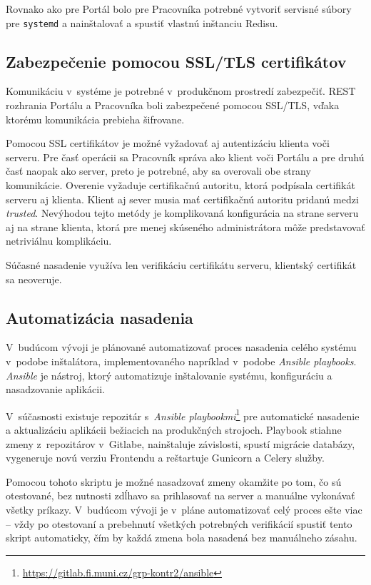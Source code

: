 \documentclass[
  digital, %
  oneside, %
  table,   %
  lof,     %
  lot,   %
]{fithesis3}
\begin{document}
Rovnako ako pre Portál bolo pre Pracovníka potrebné vytvoriť servisné súbory pre \texttt{systemd} a nainštalovať a spustiť vlastnú inštanciu Redisu.

\subsection{Zabezpečenie pomocou SSL/TLS certifikátov}

Komunikáciu v~systéme je potrebné v~produkčnom prostredí zabezpečiť. REST rozhrania Portálu a Pracovníka boli zabezpečené pomocou SSL/TLS, vďaka ktorému komunikácia prebieha šifrovane. 

Pomocou SSL certifikátov je možné vyžadovať aj autentizáciu klienta voči serveru.
Pre časť operácii sa Pracovník správa ako klient voči Portálu a pre druhú časť naopak ako server, preto je potrebné, aby sa overovali obe strany komunikácie. Overenie vyžaduje certifikačnú autoritu, ktorá podpísala certifikát serveru aj klienta\cite{RFC2818}. Klient aj sever musia mať certifikačnú autoritu pridanú medzi \emph{trusted}. Nevýhodou tejto metódy je komplikovaná konfigurácia na strane serveru aj na strane klienta, ktorá pre menej skúseného administrátora môže predstavovať netriviálnu komplikáciu.

Súčasné nasadenie využíva len verifikáciu certifikátu serveru, klientský certifikát sa neoveruje.

\subsection{Automatizácia nasadenia}

V~budúcom vývoji je plánované automatizovať proces nasadenia celého systému v~podobe inštalátora, implementovaného napríklad v~podobe \emph{Ansible playbooks}. \emph{Ansible} je nástroj, ktorý automatizuje inštalovanie systému, konfiguráciu a nasadzovanie aplikácii\cite{ansible}. 

V~súčasnosti existuje repozitár s~\emph{Ansible playbookmi}\footnote{\url{https://gitlab.fi.muni.cz/grp-kontr2/ansible}} pre automatické nasadenie a aktualizáciu aplikácii bežiacich na produkčných strojoch. Playbook stiahne zmeny z~repozitárov v~Gitlabe, nainštaluje závislosti, spustí migrácie databázy, vygeneruje novú verziu Frontendu a reštartuje Gunicorn a Celery služby.

Pomocou tohoto skriptu je možné nasadzovať zmeny okamžite po tom, čo sú otestované, bez nutnosti zdĺhavo sa prihlasovať na server a manuálne vykonávať všetky príkazy. V~budúcom vývoji je v~pláne automatizovať celý proces ešte viac -- vždy po otestovaní a prebehnutí všetkých potrebných verifikácií spustiť tento skript automaticky, čím by každá zmena bola nasadená bez manuálneho zásahu.
\end{document}
